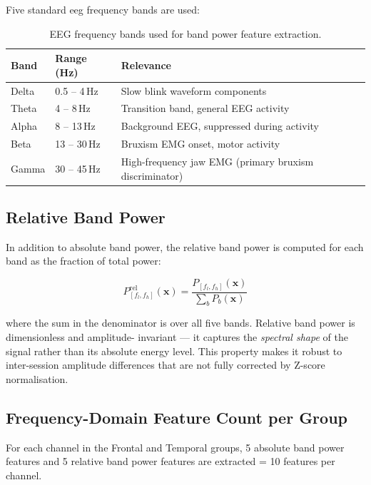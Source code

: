 Five standard \acrshort{eeg} frequency bands are used:

\begin{table}[htbp]
\centering
\caption{EEG frequency bands used for band power feature
extraction.}
\label{tab:freq_bands}
\renewcommand{\arraystretch}{1.3}
\begin{tabular}{llp{5cm}}
\toprule
\textbf{Band} & \textbf{Range (Hz)} & \textbf{Relevance} \\
\midrule
Delta & 0.5 -- 4\,Hz  & Slow blink waveform components \\
Theta & 4 -- 8\,Hz    & Transition band, general EEG activity \\
Alpha & 8 -- 13\,Hz   & Background EEG, suppressed during activity \\
Beta  & 13 -- 30\,Hz  & Bruxism EMG onset, motor activity \\
Gamma & 30 -- 45\,Hz  & High-frequency jaw EMG (primary bruxism
                        discriminator) \\
\bottomrule
\end{tabular}
\end{table}

\subsection{Relative Band Power}

In addition to absolute band power, the relative band power
is computed for each band as the fraction of total power:

\begin{equation}
P^{\text{rel}}_{[f_l,f_h]}(\mathbf{x}) =
\frac{P_{[f_l,f_h]}(\mathbf{x})}
{\sum_b P_b(\mathbf{x})}
\label{eq:rel_bandpower}
\end{equation}

\noindent where the sum in the denominator is over all five
bands. Relative band power is dimensionless and amplitude-
invariant — it captures the \textit{spectral shape} of the
signal rather than its absolute energy level. This property
makes it robust to inter-session amplitude differences that
are not fully corrected by Z-score normalisation.

\subsection{Frequency-Domain Feature Count per Group}

For each channel in the Frontal and Temporal groups, 5
absolute band power features and 5 relative band power
features are extracted = 10 features per channel.

